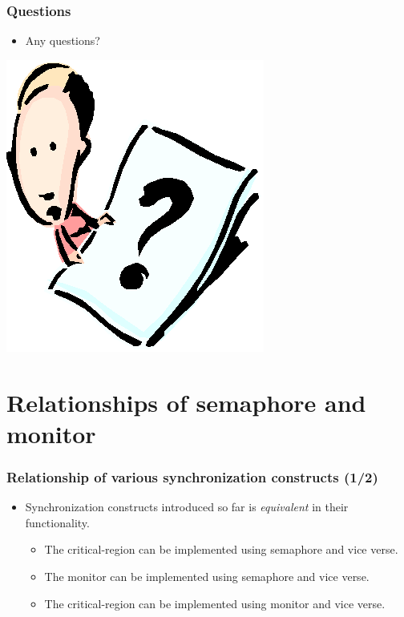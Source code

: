 \documentclass[CJKutf8,xcolor=pdftex,dvipsnames,table]{beamer}
\begin{document}
\begin{CJK*}{UTF8}{song}
  \begin{frame}
  \frametitle{Questions}
  \begin{itemize}
  \item{Any questions?}
  \end{itemize}
  \begin{center}
    \includegraphics[scale=.5]{question}
  \end{center}
  \end{frame}

\section{Relationships of semaphore and monitor}

\iffalse

  \begin{frame}
  \frametitle{Relationship of various synchronization constructs (1/2)} \pause
  \begin{itemize}
  \item{Synchronization constructs introduced so far is \emph{equivalent} in their functionality.} \pause
    \begin{itemize}
    \item{The critical-region can be implemented using semaphore and vice verse.} \pause
    \item{The monitor can be implemented using semaphore and vice verse.} \pause
    \item{The critical-region can be implemented using monitor and vice verse.}
    \end{itemize}
  \end{itemize}
  \end{frame}


\end{CJK*}
\end{document}
